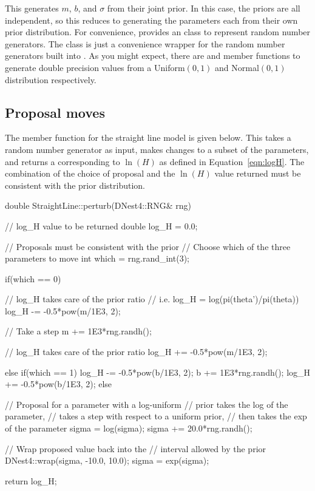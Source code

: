 \documentclass[article, nojss]{jss}
\begin{document}
This generates $m$, $b$, and $\sigma$ from their joint prior. In this case,
the priors are all independent, so this reduces to generating the parameters
each from their own prior distribution. For convenience,
 provides an  class to represent random number
generators. The  class is just a convenience wrapper for the
random number generators built into .
As you might expect, there are
 and  member functions to generate
double precision values
from a Uniform$(0,1)$ and Normal$(0,1)$ distribution respectively.

\subsection{Proposal moves}\label{sec:perturb}
The  member function for the straight line model is given below.
This takes a random number generator as input, makes changes to
a subset of the parameters, and returns a  corresponding
to $\ln(H)$ as defined in Equation~\ref{eqn:logH}. The combination of
the choice of proposal and the $\ln(H)$ value returned must be consistent
with the prior distribution.
\begin{CodeChunk}
\begin{CodeInput}
double StraightLine::perturb(DNest4::RNG& rng)
{
    // log_H value to be returned
    double log_H = 0.0;

    // Proposals must be consistent with the prior
    // Choose which of the three parameters to move
    int which = rng.rand_int(3);

    if(which == 0)
    {
        // log_H takes care of the prior ratio
        // i.e. log_H = log(pi(theta')/pi(theta))
        log_H -= -0.5*pow(m/1E3, 2);

        // Take a step
        m += 1E3*rng.randh();

        // log_H takes care of the prior ratio
        log_H += -0.5*pow(m/1E3, 2);
    }
    else if(which == 1)
    {
        log_H -= -0.5*pow(b/1E3, 2);
        b += 1E3*rng.randh();
        log_H += -0.5*pow(b/1E3, 2);
    }
    else
    {
        // Proposal for a parameter with a log-uniform
        // prior takes the log of the parameter,
        // takes a step with respect to a uniform prior,
        // then takes the exp of the parameter
        sigma = log(sigma);
        sigma += 20.0*rng.randh();

        // Wrap proposed value back into the
        // interval allowed by the prior
        DNest4::wrap(sigma, -10.0, 10.0);
        sigma = exp(sigma);
    }

    return log_H;
}
\end{CodeInput}
\end{CodeChunk}
\end{document}
